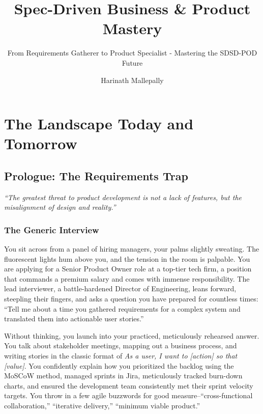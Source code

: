 \documentclass[
  11pt,
  openany,
  oneside]{book}
\title{Spec-Driven Business \& Product Mastery}
\subtitle{From Requirements Gatherer to Product Specialist - Mastering
the SDSD-POD Future}
\author{Harinath Mallepally}
\date{}
\renewenvironment{quote}{\begin{customquote}}{\end{customquote}}
\begin{document}
\frontmatter
\maketitle

{
\setcounter{tocdepth}{1}
\tableofcontents
}
\mainmatter
\part{The Landscape Today and Tomorrow}

\chapter*{Prologue: The Requirements
Trap}\label{prologue-the-requirements-trap}

\begin{quote}
\emph{``The greatest threat to product development is not a lack of
features, but the misalignment of design and reality.''}
\end{quote}

\section{The Generic Interview}\label{the-generic-interview}

You sit across from a panel of hiring managers, your palms slightly
sweating. The fluorescent lights hum above you, and the tension in the
room is palpable. You are applying for a Senior Product Owner role at a
top-tier tech firm, a position that commands a premium salary and comes
with immense responsibility. The lead interviewer, a battle-hardened
Director of Engineering, leans forward, steepling their fingers, and
asks a question you have prepared for countless times: ``Tell me about a
time you gathered requirements for a complex system and translated them
into actionable user stories.''

Without thinking, you launch into your practiced, meticulously rehearsed
answer. You talk about stakeholder meetings, mapping out a business
process, and writing stories in the classic format of \emph{As a user, I
want to {[}action{]} so that {[}value{]}}. You confidently explain how
you prioritized the backlog using the MoSCoW method, managed sprints in
Jira, meticulously tracked burn-down charts, and ensured the development
team consistently met their sprint velocity targets. You throw in a few
agile buzzwords for good measure--``cross-functional collaboration,''
``iterative delivery,'' ``minimum viable product.''
\end{document}

